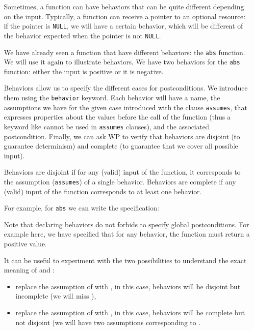 Sometimes, a function can have behaviors that can be quite different
depending on the input. Typically, a function can receive a pointer to
an optional resource: if the pointer is \texttt{NULL}, we will have a
certain behavior, which will be different of the behavior expected when
the pointer is not \texttt{NULL}.

We have already seen a function that have different behaviors: the
\texttt{abs} function. We will use it again to illustrate behaviors. We
have two behaviors for the \texttt{abs} function: either the input is
positive or it is negative.

Behaviors allow us to specify the different cases for postconditions. We
introduce them using the \texttt{behavior} keyword. Each behavior will
have a name, the assumptions we have for the given case introduced with
the clause \texttt{assumes}, that expresses properties about the values
before the call of the function (thus a keyword like
 cannot be used in \texttt{assumes}
clauses), and the associated postcondition. Finally, we can ask WP to
verify that behaviors are disjoint (to guarantee determinism) and
complete (to guarantee that we cover all possible input).

Behaviors are disjoint if for any (valid) input of the function, it
corresponds to the assumption (\texttt{assumes}) of a single behavior.
Behaviors are complete if any (valid) input of the function corresponds
to at least one behavior.

For example, for \texttt{abs} we can write the specification:






Note that declaring behaviors do not forbids to specify global postconditions.
For example here, we have specified that for any behavior, the function must
return a positive value.



It can be useful to experiment with the two possibilities to understand
the exact meaning of  and :

\begin{itemize}
\item
  replace the assumption of  with
  , in this case, behaviors will be
  disjoint but incomplete (we will miss ),
\item
  replace the assumption of  with
  , in this case, behaviors will be
  complete but not disjoint (we will have two assumptions corresponding
  to .
\end{itemize}


